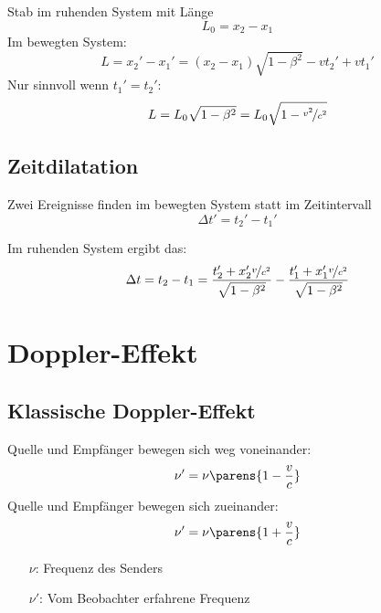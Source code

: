 		Stab im ruhenden System mit Länge
		\begin{equation*}
			L_0 = x_2 - x_1
		\end{equation*}
		Im bewegten System:
		\begin{equation*}
			L = x_2' - x_1' = (x_2 - x_1) \sqrt{1-\beta^2} - v t_2' + v t_1'
		\end{equation*}
		Nur sinnvoll wenn $t_1' = t_2'$:
		\begin{equation*}
			L = L_0 \sqrt{1-\beta^2} = L_0 \sqrt{1-\nicefrac{v^2}{c^2}}
		\end{equation*}
	\subsection{Zeitdilatation} %
		Zwei Ereignisse finden im bewegten System statt im Zeitintervall
		\begin{equation*}
			\Delta t' = t_2' - t_1'
		\end{equation*}
		
		Im ruhenden System ergibt das:
		\begin{equation*}
			\Delta t = t_2 - t_1 = \frac{t_2' + x_2' \nicefrac{v}{c^2}}{\sqrt{1-\beta^2}}
			- \frac{t_1' + x_1' \nicefrac{v}{c^2}}{\sqrt{1-\beta^2}}
		\end{equation*}
\section{Doppler-Effekt} %
	\subsection{Klassische Doppler-Effekt} %
		Quelle und Empfänger bewegen sich weg voneinander:
		\begin{equation*}
			\nu' = \nu \parens{1-\frac{v}{c}}
		\end{equation*}
		Quelle und Empfänger bewegen sich zueinander:
		\begin{equation*}
			\nu' = \nu \parens{1+\frac{v}{c}}
		\end{equation*}
		\begin{itemize}
			\item[$\nu$:] Frequenz des Senders
			\item[$\nu'$:] Vom Beobachter erfahrene Frequenz
		\end{itemize}

